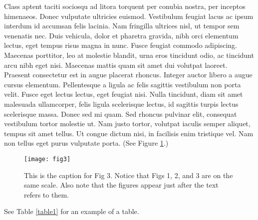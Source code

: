 Class aptent taciti sociosqu ad litora torquent per conubia nostra, per inceptos himenaeos. Donec vulputate ultricies euismod. Vestibulum feugiat lacus ac ipsum interdum id accumsan felis lacinia. Nam fringilla ultrices nisl, ut tempor sem venenatis nec. Duis vehicula, dolor et pharetra gravida, nibh orci elementum lectus, eget tempus risus magna in nunc. Fusce feugiat commodo adipiscing. Maecenas porttitor, leo at molestie blandit, urna eros tincidunt odio, ac tincidunt arcu nibh eget nisi. Maecenas mattis quam sit amet dui volutpat laoreet. Praesent consectetur est in augue placerat rhoncus. Integer auctor libero a augue cursus elementum. Pellentesque a ligula ac felis sagittis vestibulum non porta velit. Fusce eget lectus lectus, eget feugiat nisi. Nulla tincidunt, diam sit amet malesuada ullamcorper, felis ligula scelerisque lectus, id sagittis turpis lectus scelerisque massa. Donec sed mi quam. Sed rhoncus pulvinar elit, consequat vestibulum tortor molestie ut. Nam justo tortor, volutpat iaculis semper aliquet, tempus sit amet tellus. Ut congue dictum nisi, in facilisis enim tristique vel. Nam non tellus eget purus vulputate porta. (See Figure \ref{fig3}.)\begin{figure}[t]
    \begin{center}\texttt{[image: fig3]}\end{center}
	\caption{This is the caption for Fig 3.  Notice that Figs 1, 2, and 3 are on the same scale.  Also note that the figures appear just after the text refers to them.}
	\label{fig3}
\end{figure}
See Table \ref{table1} for an example of a table.
